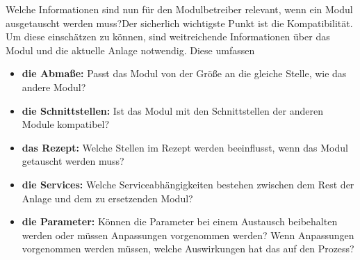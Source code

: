 Welche Informationen sind nun für den Modulbetreiber relevant, wenn ein Modul ausgetauscht werden muss?Der sicherlich wichtigste Punkt ist die Kompatibilität. Um diese einschätzen zu können, sind weitreichende Informationen über das Modul und die aktuelle Anlage notwendig. Diese umfassen
\begin{itemize}
\item \textbf{die Abmaße:} Passt das Modul von der Größe an die gleiche Stelle, wie das andere Modul?
\item \textbf{die Schnittstellen:} Ist das Modul mit den Schnittstellen der anderen Module kompatibel?
\item \textbf{das Rezept:} Welche Stellen im Rezept werden beeinflusst, wenn das Modul getauscht werden muss?
\item \textbf{die Services:} Welche Serviceabhängigkeiten bestehen zwischen dem Rest der Anlage und dem zu ersetzenden Modul?
\item \textbf{die Parameter:} Können die Parameter bei einem Austausch beibehalten werden oder müssen Anpassungen vorgenommen werden? Wenn Anpassungen vorgenommen werden müssen, welche Auswirkungen hat das auf den Prozess?
\end{itemize}

